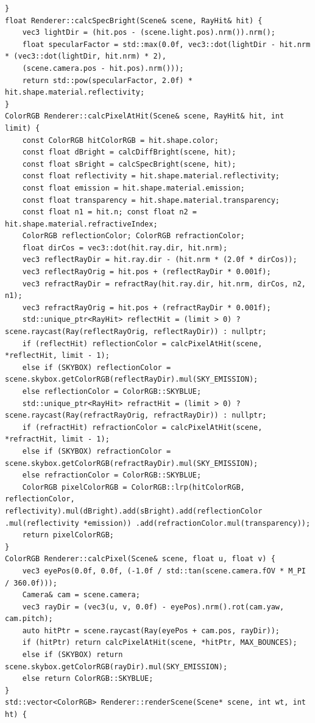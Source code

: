 \begin{lstlisting}[label=alg:3, caption=Реализация класса $Renderer$, captionpos=t]
}
float Renderer::calcSpecBright(Scene& scene, RayHit& hit) {
	vec3 lightDir = (hit.pos - (scene.light.pos).nrm()).nrm();
	float specularFactor = std::max(0.0f, vec3::dot(lightDir - hit.nrm * (vec3::dot(lightDir, hit.nrm) * 2), 
	(scene.camera.pos - hit.pos).nrm()));
	return std::pow(specularFactor, 2.0f) * hit.shape.material.reflectivity;
}
ColorRGB Renderer::calcPixelAtHit(Scene& scene, RayHit& hit, int limit) {
	const ColorRGB hitColorRGB = hit.shape.color;
	const float dBright = calcDiffBright(scene, hit);
	const float sBright = calcSpecBright(scene, hit);
	const float reflectivity = hit.shape.material.reflectivity;
	const float emission = hit.shape.material.emission;
	const float transparency = hit.shape.material.transparency;
	const float n1 = hit.n; const float n2 = hit.shape.material.refractiveIndex;
	ColorRGB reflectionColor; ColorRGB refractionColor;
	float dirCos = vec3::dot(hit.ray.dir, hit.nrm);
	vec3 reflectRayDir = hit.ray.dir - (hit.nrm * (2.0f * dirCos));
	vec3 reflectRayOrig = hit.pos + (reflectRayDir * 0.001f);
	vec3 refractRayDir = refractRay(hit.ray.dir, hit.nrm, dirCos, n2, n1);
	vec3 refractRayOrig = hit.pos + (refractRayDir * 0.001f);
	std::unique_ptr<RayHit> reflectHit = (limit > 0) ? scene.raycast(Ray(reflectRayOrig, reflectRayDir)) : nullptr;
	if (reflectHit) reflectionColor = calcPixelAtHit(scene, *reflectHit, limit - 1);
	else if (SKYBOX) reflectionColor = scene.skybox.getColorRGB(reflectRayDir).mul(SKY_EMISSION);
	else reflectionColor = ColorRGB::SKYBLUE;
	std::unique_ptr<RayHit> refractHit = (limit > 0) ? scene.raycast(Ray(refractRayOrig, refractRayDir)) : nullptr;
	if (refractHit) refractionColor = calcPixelAtHit(scene, *refractHit, limit - 1);
	else if (SKYBOX) refractionColor = scene.skybox.getColorRGB(refractRayDir).mul(SKY_EMISSION);
	else refractionColor = ColorRGB::SKYBLUE;
	ColorRGB pixelColorRGB = ColorRGB::lrp(hitColorRGB, reflectionColor, reflectivity).mul(dBright).add(sBright).add(reflectionColor .mul(reflectivity *emission)) .add(refractionColor.mul(transparency));
	return pixelColorRGB;
}
ColorRGB Renderer::calcPixel(Scene& scene, float u, float v) {
	vec3 eyePos(0.0f, 0.0f, (-1.0f / std::tan(scene.camera.fOV * M_PI / 360.0f))); 
	Camera& cam = scene.camera;
	vec3 rayDir = (vec3(u, v, 0.0f) - eyePos).nrm().rot(cam.yaw, cam.pitch);
	auto hitPtr = scene.raycast(Ray(eyePos + cam.pos, rayDir));
	if (hitPtr) return calcPixelAtHit(scene, *hitPtr, MAX_BOUNCES);
	else if (SKYBOX) return scene.skybox.getColorRGB(rayDir).mul(SKY_EMISSION);
	else return ColorRGB::SKYBLUE;
}
std::vector<ColorRGB> Renderer::renderScene(Scene* scene, int wt, int ht) {

\end{lstlisting}
